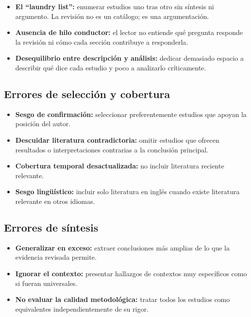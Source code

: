 \documentclass[
]{book}
\providecommand{\tightlist}{%
  \setlength{\itemsep}{0pt}\setlength{\parskip}{0pt}}
\begin{document}
\begin{itemize}
\tightlist
\item
  \textbf{El ``laundry list'':} enumerar estudios uno tras otro sin síntesis ni argumento. La revisión no es un catálogo; es una argumentación.
\item
  \textbf{Ausencia de hilo conductor:} el lector no entiende qué pregunta responde la revisión ni cómo cada sección contribuye a responderla.
\item
  \textbf{Desequilibrio entre descripción y análisis:} dedicar demasiado espacio a describir qué dice cada estudio y poco a analizarlo críticamente.
\end{itemize}

\subsection{Errores de selección y cobertura}\label{errores-de-selecciuxf3n-y-cobertura}

\begin{itemize}
\tightlist
\item
  \textbf{Sesgo de confirmación:} seleccionar preferentemente estudios que apoyan la posición del autor.
\item
  \textbf{Descuidar literatura contradictoria:} omitir estudios que ofrecen resultados o interpretaciones contrarias a la conclusión principal.
\item
  \textbf{Cobertura temporal desactualizada:} no incluir literatura reciente relevante.
\item
  \textbf{Sesgo lingüístico:} incluir solo literatura en inglés cuando existe literatura relevante en otros idiomas.
\end{itemize}

\subsection{Errores de síntesis}\label{errores-de-suxedntesis}

\begin{itemize}
\tightlist
\item
  \textbf{Generalizar en exceso:} extraer conclusiones más amplias de lo que la evidencia revisada permite.
\item
  \textbf{Ignorar el contexto:} presentar hallazgos de contextos muy específicos como si fueran universales.
\item
  \textbf{No evaluar la calidad metodológica:} tratar todos los estudios como equivalentes independientemente de su rigor.
\end{itemize}
\end{document}
